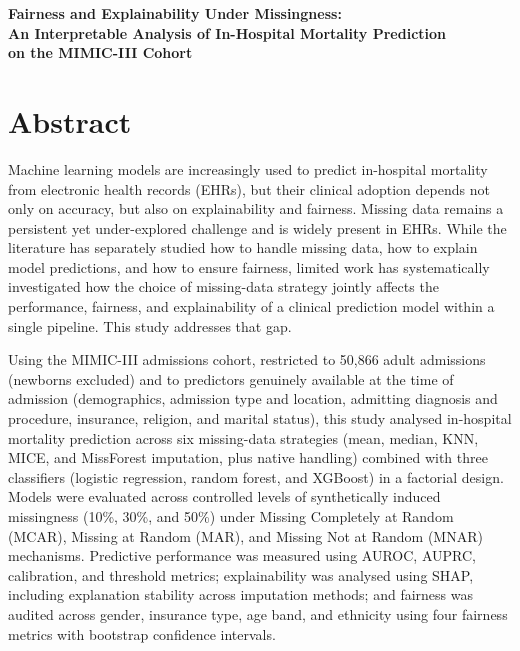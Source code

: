 \documentclass[12pt,a4paper]{report}
\begin{document}
\begin{titlepage}
\centering
\vspace*{1cm}
{\LARGE\bfseries Fairness and Explainability Under Missingness:\\[0.3cm]
An Interpretable Analysis of In-Hospital Mortality Prediction\\ on the MIMIC-III Cohort\par}
\vspace{2cm}

\end{titlepage}

\tableofcontents
\listoftables
\listoffigures


\chapter*{Abstract}
Machine learning models are increasingly used to predict in-hospital mortality from electronic health records (EHRs), but their clinical adoption depends not only on accuracy, but also on explainability and fairness. Missing data remains a persistent yet under-explored challenge and is widely present in EHRs. While the literature has separately studied how to handle missing data, how to explain model predictions, and how to ensure fairness, limited work has systematically investigated how the choice of missing-data strategy jointly affects the performance, fairness, and explainability of a clinical prediction model within a single pipeline. This study addresses that gap.

Using the MIMIC-III admissions cohort, restricted to 50,866 adult admissions (newborns excluded) and to predictors genuinely available at the time of admission (demographics, admission type and location, admitting diagnosis and procedure, insurance, religion, and marital status), this study analysed in-hospital mortality prediction across six missing-data strategies (mean, median, KNN, MICE, and MissForest imputation, plus native handling) combined with three classifiers (logistic regression, random forest, and XGBoost) in a factorial design. Models were evaluated across controlled levels of synthetically induced missingness (10\%, 30\%, and 50\%) under Missing Completely at Random (MCAR), Missing at Random (MAR), and Missing Not at Random (MNAR) mechanisms. Predictive performance was measured using AUROC, AUPRC, calibration, and threshold metrics; explainability was analysed using SHAP, including explanation stability across imputation methods; and fairness was audited across gender, insurance type, age band, and ethnicity using four fairness metrics with bootstrap confidence intervals.
\end{document}
